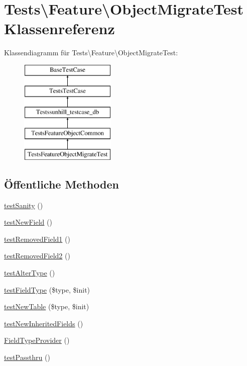 \hypertarget{classTests_1_1Feature_1_1ObjectMigrateTest}{}\section{Tests\textbackslash{}Feature\textbackslash{}Object\+Migrate\+Test Klassenreferenz}
\label{classTests_1_1Feature_1_1ObjectMigrateTest}
Klassendiagramm für Tests\textbackslash{}Feature\textbackslash{}Object\+Migrate\+Test\+:\begin{figure}[H]
\begin{center}
\leavevmode
\includegraphics[height=5.000000cm]{d8/d32/classTests_1_1Feature_1_1ObjectMigrateTest}
\end{center}
\end{figure}
\subsection*{Öffentliche Methoden}
\begin{DoxyCompactItemize}
\item 
\hyperlink{classTests_1_1Feature_1_1ObjectMigrateTest_aca8f7cf11a810bfa4d945247a0cb3233}{test\+Sanity} ()
\item 
\hyperlink{classTests_1_1Feature_1_1ObjectMigrateTest_a2c90b23f39df58dd941292c9272f2c1b}{test\+New\+Field} ()
\item 
\hyperlink{classTests_1_1Feature_1_1ObjectMigrateTest_a8961356a7f931b8f737934b742e54d0b}{test\+Removed\+Field1} ()
\item 
\hyperlink{classTests_1_1Feature_1_1ObjectMigrateTest_a21ddb614892ee6de453cb6364ad8db65}{test\+Removed\+Field2} ()
\item 
\hyperlink{classTests_1_1Feature_1_1ObjectMigrateTest_a28c25e2f5034f6d86bced9d830919374}{test\+Alter\+Type} ()
\item 
\hyperlink{classTests_1_1Feature_1_1ObjectMigrateTest_a51422e28b42c9be2797b32a2365ab268}{test\+Field\+Type} (\$type, \$init)
\item 
\hyperlink{classTests_1_1Feature_1_1ObjectMigrateTest_ae30890814af46b6fcde1f75b1376e1ba}{test\+New\+Table} (\$type, \$init)
\item 
\hyperlink{classTests_1_1Feature_1_1ObjectMigrateTest_ae24bed9e64ab101c892e0ae3dea66c59}{test\+New\+Inherited\+Fields} ()
\item 
\hyperlink{classTests_1_1Feature_1_1ObjectMigrateTest_a90b3fd06f88b48898a93f1f9425f7322}{Field\+Type\+Provider} ()
\item 
\hyperlink{classTests_1_1Feature_1_1ObjectMigrateTest_a8101cf0b2c68e129ea7719b5ab5af026}{test\+Passthru} ()
\end{DoxyCompactItemize}
